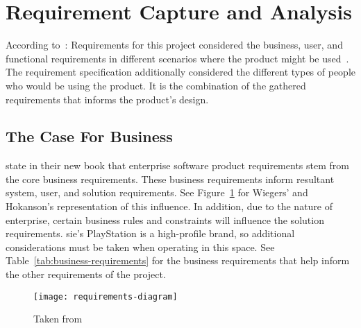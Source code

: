 \thispagestyle{plain}
\newpage
\section{Requirement Capture and Analysis}\label{sec:requirement-capture}

\normalsize

According to~\citet{anton2003successful}: 
Requirements for this project considered the business, user, and functional requirements in different scenarios where the product might be used~\citep{wiegers2000karl, potts1994inquiry}.
The requirement specification additionally considered the different types of people who would be using the product.
It is the combination of the gathered requirements that informs the product's design.

\subsection{The Case For Business}\label{subsec:the-business-case}

\citet{wiegers_hokanson_2023} state in their new book that enterprise software product requirements stem from the core business requirements.
These business requirements inform resultant system, user, and solution requirements.
See Figure~\ref{fig:requirements-diagram} for Wiegers' and Hokanson's representation of this influence.
In addition, due to the nature of enterprise, certain business rules and constraints will influence the solution requirements.
\gls{sie}'s PlayStation is a high-profile brand, so additional considerations must be taken when operating in this space.
See Table~\ref{tab:business-requirements} for the business requirements that help inform the other requirements of the project.

\begin{figure}[!htb]
    \minipage{\textwidth}
    \texttt{[image: requirements-diagram]}
    \caption{Taken from~\citep{wiegers_hokanson_2023}}\label{fig:requirements-diagram}
    \endminipage\hfill
\end{figure}

